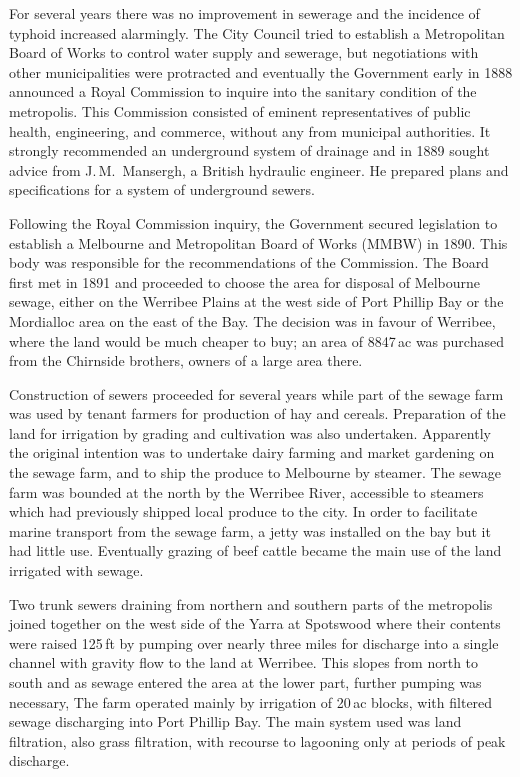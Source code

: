 For several years there was no improvement in sewerage and the
incidence of typhoid increased alarmingly.  The City Council tried to
establish a Metropolitan Board of Works to control water supply and
sewerage, but negotiations with other municipalities were protracted
and eventually the Government early in 1888 announced a Royal
Commission to inquire into the sanitary condition of the metropolis.
This Commission consisted of eminent representatives of public health,
engineering, and commerce, without any from municipal authorities.  It
strongly recommended an underground system of drainage and in 1889
sought advice from J.\,M.~Mansergh, a British hydraulic engineer.  He
prepared plans and specifications for a system of underground
sewers.

Following the Royal Commission inquiry, the Government secured
legislation to establish a Melbourne and Metropolitan Board of Works
(MMBW) in 1890.  This body was responsible for the recommendations of
the Commission.  The Board first met in 1891 and proceeded to choose
the area for disposal of Melbourne sewage, either on the Werribee
Plains at the west side of Port Phillip Bay or the Mordialloc area on
the east of the Bay.  The decision was in favour of Werribee, where
the land would be much cheaper to buy; an area of 8847\,ac was
purchased from the Chirnside brothers, owners of a large area
there.

Construction of sewers proceeded for several years while part of the
sewage farm was used by tenant farmers for production of hay and
cereals.  Preparation of the land for irrigation by grading and
cultivation was also undertaken.  Apparently the original intention
was to undertake dairy farming and market gardening on the sewage
farm, and to ship the produce to Melbourne by steamer. The sewage farm
was bounded at the north by the Werribee River, accessible to steamers
which had previously shipped local produce to the city.  In order to
facilitate marine transport from the sewage farm, a jetty was
installed on the bay but it had little use.  Eventually grazing of
beef cattle became the main use of the land irrigated with
sewage.

Two trunk sewers draining from northern and southern parts of the
metropolis joined together on the west side of the Yarra at Spotswood
where their contents were raised 125\,ft by pumping over nearly three
miles for discharge into a single channel with gravity flow to the
land at Werribee.  This slopes from north to south and as sewage
entered the area at the lower part, further pumping was necessary, The
farm operated mainly by irrigation of 20\,ac blocks, with filtered
sewage discharging into Port Phillip Bay.  The main system used was
land filtration, also grass filtration, with recourse to lagooning
only at periods of peak discharge.

